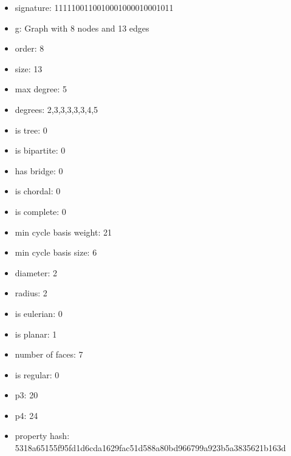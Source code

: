 \begin{itemize}
\item signature: 1111100110010001000010001011
\item g: Graph with 8 nodes and 13 edges
\item order: 8
\item size: 13
\item max degree: 5
\item degrees: 2,3,3,3,3,3,4,5
\item is tree: 0
\item is bipartite: 0
\item has bridge: 0
\item is chordal: 0
\item is complete: 0
\item min cycle basis weight: 21
\item min cycle basis size: 6
\item diameter: 2
\item radius: 2
\item is eulerian: 0
\item is planar: 1
\item number of faces: 7
\item is regular: 0
\item p3: 20
\item p4: 24
\item property hash: 5318a65155f95fd1d6cda1629fac51d588a80bd966799a923b5a3835621b163d
\end{itemize}
\newpage
\begin{figure}
\end{figure}
